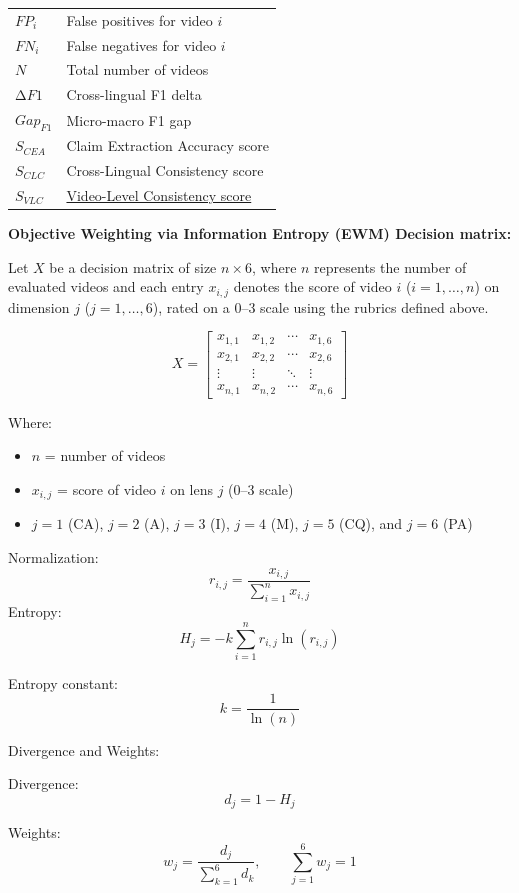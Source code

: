 \documentclass[]{article}
\begin{document}
\begin{longtable}[]{@{}
  >{\raggedright\arraybackslash}p{}
  >{\raggedright\arraybackslash}p{}@{}}
\(FP_{i}\) & False positives for video \(i\) \\
\(FN_{i}\) & False negatives for video \(i\) \\
\(N\) & Total number of videos \\
\(\mathrm{\Delta}F1\) & Cross-lingual F1 delta \\
\(Gap_{F1}\) & Micro-macro F1 gap \\
\(S_{CEA}\) & Claim Extraction Accuracy score \\
\(S_{CLC}\) & Cross-Lingual Consistency score \\
\(S_{VLC}\) & \ul{Video-Level Consistency score} \\
\end{longtable}

\textbf{Objective Weighting via Information Entropy (EWM) Decision matrix:}

Let \(X\) be a decision matrix of size \(n \times 6\), where \(n\) represents
the number of evaluated videos and each entry \(x_{i,j}\) denotes the score of
video \(i\) (\(i=1,\ldots,n\)) on dimension \(j\)
(\(j=1,\ldots,6\)), rated on a 0--3 scale using the rubrics defined
above.

\[
X = \begin{bmatrix}
x_{1,1} & x_{1,2} & \cdots & x_{1,6} \\
x_{2,1} & x_{2,2} & \cdots & x_{2,6} \\
\vdots & \vdots & \ddots & \vdots \\
x_{n,1} & x_{n,2} & \cdots & x_{n,6}
\end{bmatrix}
\]

Where:

\begin{itemize}
\item
  \(n\) = number of videos
\item
  \(x_{i,j}\) = score of video \(i\) on lens \(j\) (0--3 scale)
\item
  \(j=1\) (CA), \(j=2\) (A), \(j=3\) (I), \(j=4\) (M), \(j=5\) (CQ), and \(j=6\) (PA)
\end{itemize}

Normalization:
\[
r_{i,j} = \frac{x_{i,j}}{\sum_{i=1}^{n} x_{i,j}}
\]
Entropy:
\[
H_j = -k \sum_{i=1}^{n} r_{i,j}\ln(r_{i,j})
\]

Entropy constant:
\[
k = \frac{1}{\ln(n)}
\]

Divergence and Weights:

Divergence:
\[
d_j = 1 - H_j
\]

Weights:
\[
w_j = \frac{d_j}{\sum_{k=1}^{6} d_k}, \qquad \sum_{j=1}^{6} w_j = 1
\]
\end{document}
